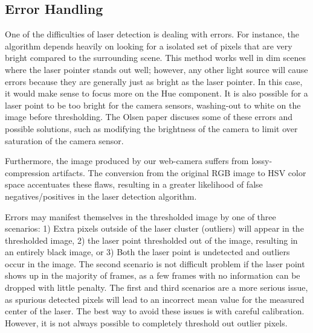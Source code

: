 \documentclass[10pt,twocolumn,letterpaper]{article}
\begin{document}
\subsection{Error Handling}

One of the difficulties of laser detection is dealing with errors. For instance, the algorithm depends heavily on looking for a isolated set of pixels that are very bright compared to the surrounding scene. This method works well in dim scenes where the laser pointer stands out well; however, any other light source will cause errors because they are generally just as bright as the laser pointer. In this case, it would make sense to focus more on the Hue component. It is also possible for a laser point to be too bright for the camera sensors, washing-out to white on the image before thresholding. The Olsen paper \cite{olsen01laser} discuses some of these errors and possible solutions, such as modifying the brightness of the camera to limit over saturation of the camera sensor.

Furthermore, the image produced by our web-camera suffers from lossy-compression artifacts.  The conversion from the original RGB image to HSV color space accentuates these flaws, resulting in a greater likelihood of false negatives/positives in the laser detection algorithm.

Errors may manifest themselves in the thresholded image by one of three scenarios: 1) Extra pixels outside of the laser cluster (outliers) will appear in the thresholded image, 2) the laser point thresholded out of the image, resulting in an entirely black image, or 3) Both the laser point is undetected and outliers occur in the image.  The second scenario is not difficult problem if the laser point shows up in the majority of frames, as a few frames with no information can be dropped with little penalty.  The first and third scenarios are a more serious issue, as spurious detected pixels will lead to an incorrect mean value for the measured center of the laser.  The best way to avoid these issues is with careful calibration.  However, it is not always possible to completely threshold out outlier pixels.
\end{document}
